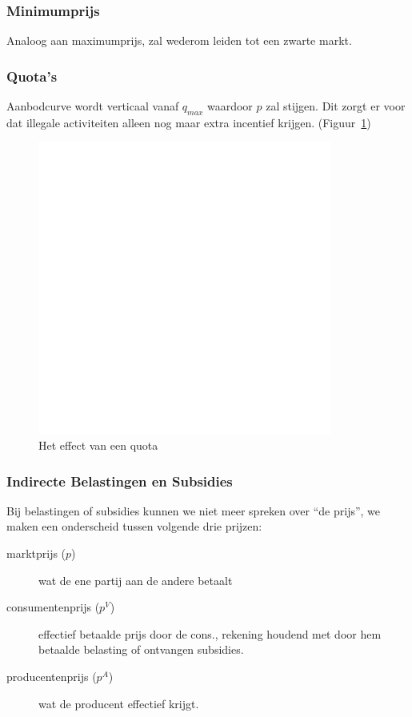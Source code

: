 \subsubsection{Minimumprijs}
Analoog aan maximumprijs, zal wederom leiden tot een zwarte markt.


\subsubsection{Quota's}
Aanbodcurve wordt verticaal vanaf $q_{max}$ waardoor $p$ zal stijgen. Dit zorgt er voor dat illegale activiteiten alleen nog maar extra incentief krijgen. (Figuur~\ref{fig:quota})
\begin{figure}[htbp]
	\centering
	\includegraphics[scale=0.4]{Images/white.png}
	\caption{Het effect van een quota}
	\label{fig:quota}
\end{figure}


\subsubsection{Indirecte Belastingen en Subsidies}
Bij belastingen of subsidies kunnen we niet meer spreken over ``de prijs'', we maken een onderscheid tussen volgende drie prijzen:
\begin{description}
	\item[marktprijs ($p$)] wat de ene partij aan de andere betaalt
    \item[consumentenprijs ($p^V$)] effectief betaalde prijs door de cons., rekening houdend met door hem betaalde belasting of ontvangen subsidies.
    \item[producentenprijs ($p^A$)] wat de producent effectief krijgt.
\end{description}

